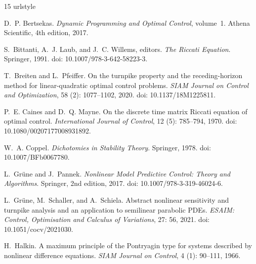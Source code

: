 \documentclass[twocolumn,nameyear,amsthm]{autart}
\numberwithin{equation}{section}
\begin{document}
\begingroup
\fontsize{7.8}{8.15}\selectfont
\setlength{\bibsep}{0pt}
\begin{thebibliography}{15}
\providecommand{\natexlab}[1]{#1}
\providecommand{\url}[1]{\texttt{#1}}
\expandafter\ifx\csname urlstyle\endcsname\relax
  \providecommand{\doi}[1]{doi: #1}\else
  \providecommand{\doi}{doi: \begingroup \urlstyle{rm}\Url}\fi

D.~P. Bertsekas.
\newblock \emph{Dynamic Programming and Optimal Control}, volume~1.
\newblock Athena Scientific, 4th edition, 2017.

S.~Bittanti, A.~J. Laub, and J.~C. Willems, editors.
\newblock \emph{The Riccati Equation}.
\newblock Springer, 1991.
\newblock \doi{10.1007/978-3-642-58223-3}.

T.~Breiten and L.~Pfeiffer.
\newblock On the turnpike property and the receding-horizon method for
  linear-quadratic optimal control problems.
\newblock \emph{SIAM Journal on Control and Optimization},
  58 (2): 1077--1102, 2020.
\newblock \doi{10.1137/18M1225811}.

P.~E. Caines and D.~Q. Mayne.
\newblock On the discrete time matrix Riccati equation of optimal control.
\newblock \emph{International Journal of Control}, 12 (5):
  785--794, 1970.
\newblock \doi{10.1080/00207177008931892}.

W.~A. Coppel.
\newblock \emph{Dichotomies in Stability Theory}.
\newblock Springer, 1978.
\newblock \doi{10.1007/BFb0067780}.

L.~Gr{\"u}ne and J.~Pannek.
\newblock \emph{Nonlinear Model Predictive Control: Theory and Algorithms}.
\newblock Springer, 2nd edition, 2017.
\newblock \doi{10.1007/978-3-319-46024-6}.

L.~Gr{\"u}ne, M.~Schaller, and A.~Schiela.
\newblock Abstract nonlinear sensitivity and turnpike analysis and an
  application to semilinear parabolic {PDEs}.
\newblock \emph{ESAIM: Control, Optimisation and Calculus of Variations},
  27: 56, 2021.
\newblock \doi{10.1051/cocv/2021030}.

H.~Halkin.
\newblock A maximum principle of the {Pontryagin} type for systems described by
  nonlinear difference equations.
\newblock \emph{SIAM Journal on Control}, 4 (1): 90--111,
  1966.


\end{thebibliography}
\end{document}
